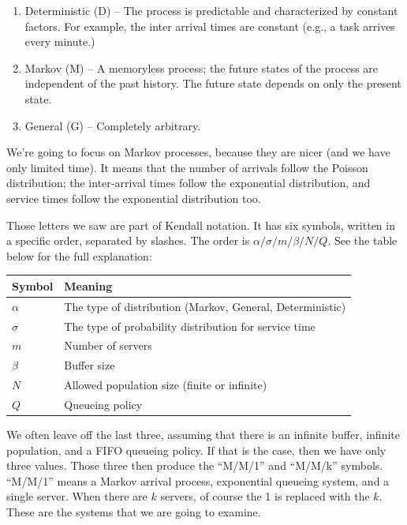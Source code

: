 \documentclass[a4paper]{report}
\begin{document}
\begin{enumerate}
	\item Deterministic (D) -- The process is predictable and characterized by constant factors. For example, the inter arrival times are constant (e.g., a task arrives every minute.)
	\item Markov (M) -- A memoryless process; the future states of the process are independent of the past history. The future state depends on only the present state.
	\item General (G) -- Completely arbitrary.
\end{enumerate}

We're going to focus on Markov processes, because they are nicer (and we have only limited time). It means that the number of arrivals follow the Poisson distribution; the inter-arrival times follow the exponential distribution, and service times follow the exponential distribution too. 

Those letters we saw are part of Kendall notation. It has six symbols, written in a specific order, separated by slashes. The order is $\alpha / \sigma / m / \beta / N / Q$. See the table below for the full explanation:

\begin{center}
\begin{tabular}{l|l} 
	\textbf{Symbol} & \textbf{Meaning} \\ \hline
	$\alpha$ & The type of distribution (Markov, General, Deterministic) \\ \hline
	$\sigma$ & The type of probability distribution for service time \\ \hline
	$m$ & Number of servers \\ \hline
	$\beta$ & Buffer size \\ \hline
	$N$ & Allowed population size (finite or infinite) \\ \hline
	$Q$ & Queueing policy \\ 
\end{tabular}
\end{center}

We often leave off the last three, assuming that there is an infinite buffer, infinite population, and a FIFO queueing policy. If that is the case, then we have only three values. Those three then produce the ``M/M/1'' and ``M/M/k'' symbols. ``M/M/1'' means a Markov arrival process, exponential queueing system, and a single server. When there are $k$ servers, of course the 1 is replaced with the $k$. These are the systems that we are going to examine.
\end{document}
